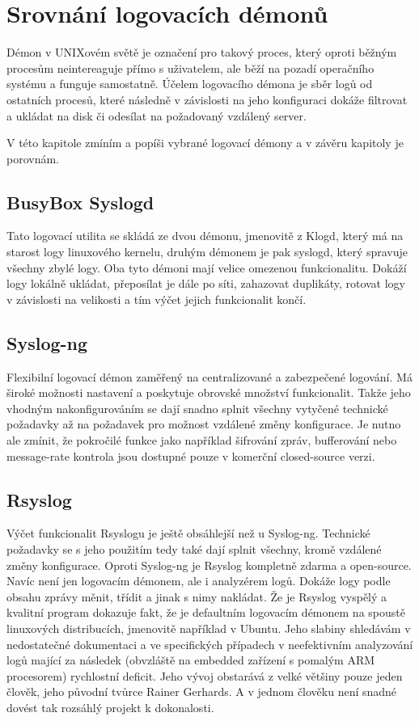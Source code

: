 \documentclass[thesis=B,czech]{FITthesis}[2012/06/26]
\begin{document}
\section{Srovnání logovacích démonů}
Démon v UNIXovém světě je označení pro takový proces, který oproti běžným procesům neintereaguje přímo s uživatelem, ale běží na pozadí operačního systému a funguje samostatně. Účelem logovacího démona je sběr logů od ostatních procesů, které následně v závislosti na jeho konfiguraci dokáže filtrovat a ukládat na disk či odesílat na požadovaný vzdálený server.

V této kapitole zmíním a popíši vybrané logovací démony a v závěru kapitoly je porovnám.

\subsection*{BusyBox Syslogd}
Tato logovací utilita se skládá ze dvou démonu, jmenovitě z Klogd, který má na starost logy linuxového kernelu, druhým démonem je pak syslogd, který spravuje všechny zbylé logy.
Oba tyto démoni mají velice omezenou funkcionalitu. Dokáží logy lokálně ukládat, přeposílat je dále po síti, zahazovat duplikáty, rotovat logy v závislosti na velikosti a tím výčet jejich funkcionalit končí.

\subsection*{Syslog-ng}
Flexibilní logovací démon zaměřený na centralizované a zabezpečené logování. Má široké možnosti nastavení a poskytuje obrovské množství funkcionalit. Takže jeho vhodným nakonfigurováním se dají snadno splnit všechny vytyčené technické požadavky až na požadavek pro možnost vzdálené změny konfigurace.
Je nutno ale zmínit, že pokročilé funkce jako například šifrování zpráv, bufferování nebo message-rate kontrola jsou dostupné pouze v komerční closed-source verzi.

\subsection*{Rsyslog}
Výčet funkcionalit Rsyslogu je ještě obsáhlejší než u Syslog-ng. Technické požadavky se s jeho použitím tedy také dají splnit všechny, kromě vzdálené změny konfigurace. Oproti Syslog-ng je Rsyslog kompletně zdarma a open-source. Navíc není jen logovacím démonem, ale i analyzérem logů. Dokáže logy podle obsahu zprávy měnit, třídit a jinak s nimy nakládat.
Že je Rsyslog vyspělý a kvalitní program dokazuje fakt, že je defaultním logovacím démonem na spoustě linuxových distribucích, jmenovitě například v Ubuntu.
Jeho slabiny shledávám v nedostatečné dokumentaci a ve specifických případech v neefektivním analyzování logů mající za následek (obvzláště na embedded zařízení s pomalým ARM procesorem) rychlostní deficit. Jeho vývoj obstarává z velké většiny pouze jeden člověk, jeho původní tvůrce Rainer Gerhards. A v jednom člověku není snadné dovést tak rozsáhlý projekt k dokonalosti.
\end{document}
